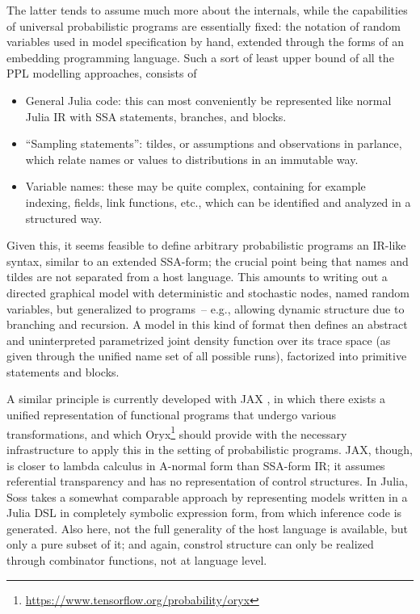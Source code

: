 The latter tends to assume much more about the internals, while the capabilities of universal
probabilistic programs are essentially fixed: the notation of random variables used in model
specification by hand, extended through the forms of an embedding programming language.  Such a sort
of least upper bound of all the PPL modelling approaches, consists of
\begin{itemize}
  \firmlist
\item General Julia code: this can most conveniently be represented like normal Julia IR with SSA
  statements, branches, and blocks.
\item \enquote{Sampling statements}: tildes, or assumptions and observations in \turingjl{}
  parlance, which relate names or values to distributions in an immutable way.
\item Variable names: these may be quite complex, containing for example indexing, fields, link
  functions, etc., which can be identified and analyzed in a structured way.
\end{itemize}
Given this, it seems feasible to define arbitrary probabilistic programs an IR-like syntax, similar
to an extended SSA-form; the crucial point being that names and tildes are not separated from a host
language.  This amounts to writing out a directed graphical model with deterministic and stochastic
nodes, named random variables, but generalized to programs~-- e.g., allowing dynamic structure due
to branching and recursion.  A model in this kind of format then defines an abstract and
uninterpreted parametrized joint density function over its trace space (as given through the unified
name set of all possible runs), factorized into primitive statements and blocks.

A similar principle is currently developed with JAX \parencite{bradbury2018jax}, in which there
exists a unified representation of functional programs that undergo various transformations, and
which Oryx\footnote{\protect\url{https://www.tensorflow.org/probability/oryx}} should provide with
the necessary infrastructure to apply this in the setting of probabilistic programs.  JAX, though,
is closer to lambda calculus in A-normal form than SSA-form IR; it assumes referential transparency
and has no representation of control structures.  In Julia, Soss \parencite{scherrer2019soss} takes
a somewhat comparable approach by representing models written in a Julia DSL in completely symbolic
expression form, from which inference code is generated.  Also here, not the full generality of the
host language is available, but only a pure subset of it; and again, constrol structure can only be
realized through combinator functions, not at language level.

